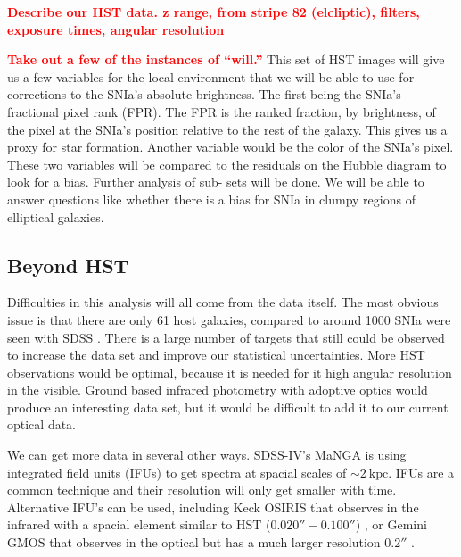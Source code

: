 \documentclass[apj, iop]{emulateapj}
\newcommand{\sn}{SNIa}
\newcommand{\todo}[1]{\textbf{\textcolor{red}{#1}}}
\begin{document}
\todo{Describe our HST data. z range, from stripe 82 (elcliptic), filters,
exposure times, angular resolution}

\todo{Take out a few of the instances of ``will.''}
This set of HST images will give us a few variables for the local environment
that we will be able to use for corrections to the \sn{}'s absolute brightness.
The first being the \sn{}'s fractional pixel rank (FPR). The FPR is the ranked
fraction, by brightness, of the pixel at the \sn{}'s position relative to the
rest of the galaxy. This gives us a proxy for star formation. Another variable
would be the color of the \sn{}'s pixel. These two variables will be compared to
the residuals on the Hubble diagram to look for a bias. Further analysis of sub-
sets will be done. We will be able to answer questions like whether there is a
bias for \sn{} in clumpy regions of elliptical galaxies.


\subsection{Beyond HST}\label{beyond-hst}

Difficulties in this analysis will all come from the data itself. The most
obvious issue is that there are only 61 host galaxies, compared to around 1000
\sn{} were seen with SDSS \citep{Campbell13}. There is a large number of targets
that still could be observed to increase the data set and improve our
statistical uncertainties. More HST observations would be optimal, because it is
needed for it high angular resolution in the visible. Ground based infrared
photometry with adoptive optics would produce an interesting data set, but it
would be difficult to add it to our current optical data.

We can get more data in several other ways. SDSS-IV's MaNGA is using integrated
field units (IFUs) to get spectra at spacial scales of $\sim 2 ~\text{kpc}$.
IFUs are a common technique and their resolution will only get smaller with
time. Alternative IFU's can be used, including Keck OSIRIS that observes in the
infrared with a spacial element similar to HST ($0.020'' - 0.100''$)
\citep{OSIRIS},
or Gemini GMOS that observes in the optical but has a much larger resolution
$0.2''$ \citep{Gemini}.
\end{document}

